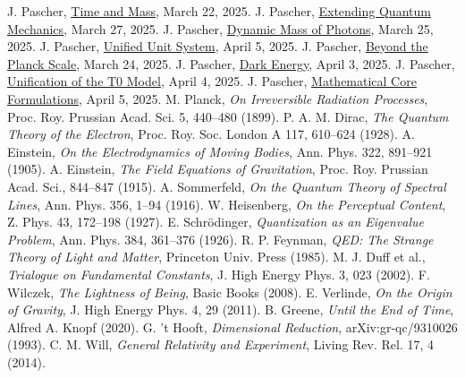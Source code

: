 \documentclass[12pt,a4paper]{article}
\begin{document}
\begin{thebibliography}{99}
		 J. Pascher, \href{https://github.com/jpascher/T0-Time-Mass-Duality/tree/main/2/pdf/English/ZeitMasseNeuerBlickEn.pdf}{Time and Mass}, March 22, 2025.
		 J. Pascher, \href{https://github.com/jpascher/T0-Time-Mass-Duality/tree/main/2/pdf/English/NotwendigkeitQMErweiterungEn.pdf}{Extending Quantum Mechanics}, March 27, 2025.
		 J. Pascher, \href{https://github.com/jpascher/T0-Time-Mass-Duality/tree/main/2/pdf/English/DynMassePhotonenNichtlokalEn.pdf}{Dynamic Mass of Photons}, March 25, 2025.
		 J. Pascher, \href{https://github.com/jpascher/T0-Time-Mass-Duality/tree/main/2/pdf/English/Alpha1Beta1KonsistenzEn.pdf}{Unified Unit System}, April 5, 2025.
		 J. Pascher, \href{https://github.com/jpascher/T0-Time-Mass-Duality/tree/main/2/pdf/English/JenseitsPlanckEn.pdf}{Beyond the Planck Scale}, March 24, 2025.
		 J. Pascher, \href{https://github.com/jpascher/T0-Time-Mass-Duality/tree/main/2/pdf/English/MathEnergiedynamikEn.pdf}{Dark Energy}, April 3, 2025.
		 J. Pascher, \href{https://github.com/jpascher/T0-Time-Mass-Duality/tree/main/2/pdf/English/T0VereinheitlichungDEGalEn.pdf}{Unification of the T0 Model}, April 4, 2025.
		 J. Pascher, \href{https://github.com/jpascher/T0-Time-Mass-Duality/tree/main/2/pdf/English/MathZeitMasseLagrangeEn.pdf}{Mathematical Core Formulations}, April 5, 2025.
		 M. Planck, \textit{On Irreversible Radiation Processes}, Proc. Roy. Prussian Acad. Sci. 5, 440--480 (1899).
		 P. A. M. Dirac, \textit{The Quantum Theory of the Electron}, Proc. Roy. Soc. London A 117, 610--624 (1928).
		 A. Einstein, \textit{On the Electrodynamics of Moving Bodies}, Ann. Phys. 322, 891--921 (1905).
		 A. Einstein, \textit{The Field Equations of Gravitation}, Proc. Roy. Prussian Acad. Sci., 844--847 (1915).
		 A. Sommerfeld, \textit{On the Quantum Theory of Spectral Lines}, Ann. Phys. 356, 1--94 (1916).
		 W. Heisenberg, \textit{On the Perceptual Content}, Z. Phys. 43, 172--198 (1927).
		 E. Schrödinger, \textit{Quantization as an Eigenvalue Problem}, Ann. Phys. 384, 361--376 (1926).
		 R. P. Feynman, \textit{QED: The Strange Theory of Light and Matter}, Princeton Univ. Press (1985).
		 M. J. Duff et al., \textit{Trialogue on Fundamental Constants}, J. High Energy Phys. 3, 023 (2002).
		 F. Wilczek, \textit{The Lightness of Being}, Basic Books (2008).
		 E. Verlinde, \textit{On the Origin of Gravity}, J. High Energy Phys. 4, 29 (2011).
		 B. Greene, \textit{Until the End of Time}, Alfred A. Knopf (2020).
		 G. 't Hooft, \textit{Dimensional Reduction}, arXiv:gr-qc/9310026 (1993).
		 C. M. Will, \textit{General Relativity and Experiment}, Living Rev. Rel. 17, 4 (2014).
	\end{thebibliography}
	
\end{document}
